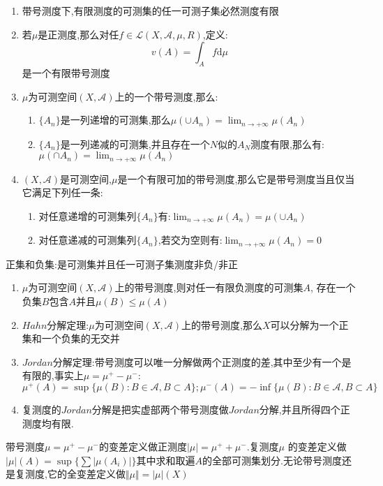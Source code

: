 \begin{enumerate}
  \item 带号测度下,有限测度的可测集的任一可测子集必然测度有限
  \item 若$\mu$是正测度,那么对任$f\in\mathscr{L}(X,\mathscr{A},\mu,R)$,定义:
  $$v(A)=\int_A f\mathrm{d}\mu$$是一个有限带号测度
  \item $\mu$为可测空间$(X,\mathscr{A})$上的一个带号测度,那么:
  \begin{enumerate}
  \item $\{A_n\}$是一列递增的可测集,那么$\mu(\cup A_n)=\lim_{n\to +\infty}\mu(A_n)$
  \item $\{A_n\}$是一列递减的可测集,并且存在一个$N$似的$A_N$测度有限,那么有:
  $\mu(\cap A_n)=\lim_{n\to+\infty}\mu(A_n)$
  \end{enumerate}
  \item $(X,\mathscr{A})$是可测空间,$\mu$是一个有限可加的带号测度,那么它是带号测度当且仅当它满足下列任一条:
  \begin{enumerate}
  \item 对任意递增的可测集列$\{A_n\}$有:$\lim_ {n\to+\infty}\mu(A_n)=\mu(\cup A_n)$
  \item 对任意递减的可测集列$\{A_n\}$,若交为空则有:$\lim_ {n\to+\infty}\mu(A_n)=0$
  \end{enumerate}
\end{enumerate}

正集和负集:是可测集并且任一可测子集测度非负/非正

\begin{enumerate}
  \item $\mu$为可测空间$(X,\mathscr{A})$上的带号测度,则对任一有限负测度的可测集$A$, 存在一个负集$B$包含$A$并且$\mu(B)\le\mu(A)$
  \item $Hahn$分解定理:$\mu$为可测空间$(X,\mathscr{A})$上的带号测度,那么$X$可以分解为一个正集和一个负集的无交并
  \item $Jordan$分解定理:带号测度可以唯一分解做两个正测度的差,其中至少有一个是有限的,事实上$\mu=\mu^+-\mu^-$:
  $$\mu^+(A)=\sup\{\mu(B):B\in\mathscr{A},B\subset A\};\mu^-(A)=-\inf\{\mu(B):B\in\mathscr{A},B\subset A\}$$
  \item 复测度的$Jordan$分解是把实虚部两个带号测度做$Jordan$分解,并且所得四个正测度均有限.
\end{enumerate}

带号测度$\mu=\mu^+-\mu^-$的变差定义做正测度$|\mu|=\mu^++\mu^-$.复测度$\mu$ 的变差定义做$|\mu|(A)=\sup\{\sum|\mu(A_i)|\}$其中求和取遍$A$的全部可测集划分.无论带号测度还是复测度,它的全变差定义做$\Vert\mu\Vert=|\mu|(X)$

